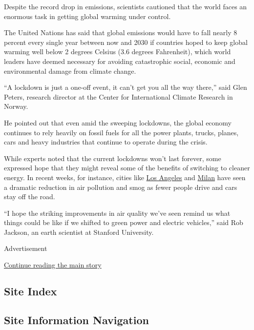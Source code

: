 Despite the record drop in emissions, scientists cautioned that the
world faces an enormous task in getting global warming under control.

The United Nations has said that global emissions would have to fall
nearly 8 percent every single year between now and 2030 if countries
hoped to keep global warming well below 2 degrees Celsius (3.6 degrees
Fahrenheit), which world leaders have deemed necessary for avoiding
catastrophic social, economic and environmental damage from climate
change.

``A lockdown is just a one-off event, it can't get you all the way
there,'' said Glen Peters, research director at the Center for
International Climate Research in Norway.

He pointed out that even amid the sweeping lockdowns, the global economy
continues to rely heavily on fossil fuels for all the power plants,
trucks, planes, cars and heavy industries that continue to operate
during the crisis.

While experts noted that the current lockdowns won't last forever, some
expressed hope that they might reveal some of the benefits of switching
to cleaner energy. In recent weeks, for instance, cities like
\href{https://www.nytimes3xbfgragh.onion/interactive/2020/03/22/climate/coronavirus-usa-traffic.html}{Los
Angeles} and
\href{https://www.nytimes3xbfgragh.onion/interactive/2020/climate/coronavirus-pollution.html}{Milan}
have seen a dramatic reduction in air pollution and smog as fewer people
drive and cars stay off the road.

``I hope the striking improvements in air quality we've seen remind us
what things could be like if we shifted to green power and electric
vehicles,'' said Rob Jackson, an earth scientist at Stanford University.

Advertisement

\protect\hyperlink{after-bottom}{Continue reading the main story}

\hypertarget{site-index}{%
\subsection{Site Index}\label{site-index}}

\hypertarget{site-information-navigation}{%
\subsection{Site Information
Navigation}\label{site-information-navigation}}

